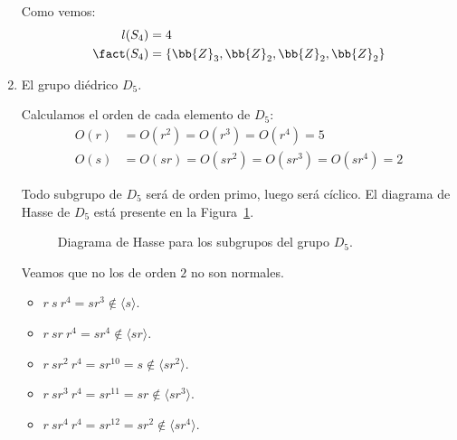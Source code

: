 \begin{ejercicio}
\begin{enumerate}
        Como vemos:
        \begin{align*}
            l(S_4) &= 4 \\
            \fact(S_4) &= \{\bb{Z}_3, \bb{Z}_2, \bb{Z}_2, \bb{Z}_2\}
        \end{align*}
        \item El grupo diédrico $D_5$.
        
        Calculamos el orden de cada elemento de $D_5$:
        \begin{align*}
            O(r) &= O(r^2) = O(r^3) = O(r^4) = 5 \\
            O(s) &= O(sr) = O(sr^2) = O(sr^3) = O(sr^4) = 2
        \end{align*}

        Todo subgrupo de $D_5$ será de orden primo, luego será cíclico. El diagrama de Hasse de $D_5$ está presente en la Figura~\ref{fig:Hasse_D5}.
        \begin{figure}
            \centering
            \caption{Diagrama de Hasse para los subgrupos del grupo $D_5$.}
            \label{fig:Hasse_D5}
        \end{figure}     
        
        Veamos que no los de orden $2$ no son normales.
        \begin{itemize}
            \item $r\ s\ r^4 = sr^3 \notin \langle s \rangle$.
            \item $r\ sr \ r^4 = sr^4 \notin \langle sr \rangle$.
            \item $r\ sr^2 \ r^4 = sr^{10} = s \notin \langle sr^2 \rangle$.
            \item $r\ sr^3 \ r^4 = sr^{11} = sr \notin \langle sr^3 \rangle$.
            \item $r\ sr^4 \ r^4 = sr^{12} = sr^2 \notin \langle sr^4 \rangle$.
        \end{itemize}


\end{enumerate}
\end{ejercicio}
